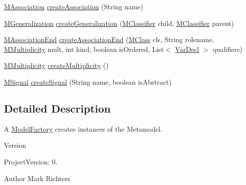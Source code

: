 \begin{DoxyCompactItemize}
\item 
\hyperlink{interfaceorg_1_1tzi_1_1use_1_1uml_1_1mm_1_1_m_association}{M\-Association} \hyperlink{classorg_1_1tzi_1_1use_1_1uml_1_1mm_1_1_model_factory_a3cbbfb827aa6c8ed703ba635f4c519ff}{create\-Association} (String name)
\item 
\hyperlink{classorg_1_1tzi_1_1use_1_1uml_1_1mm_1_1_m_generalization}{M\-Generalization} \hyperlink{classorg_1_1tzi_1_1use_1_1uml_1_1mm_1_1_model_factory_a00cbabfc373b582fb77c0740a5559d62}{create\-Generalization} (\hyperlink{interfaceorg_1_1tzi_1_1use_1_1uml_1_1mm_1_1_m_classifier}{M\-Classifier} child, \hyperlink{interfaceorg_1_1tzi_1_1use_1_1uml_1_1mm_1_1_m_classifier}{M\-Classifier} parent)
\item 
\hyperlink{classorg_1_1tzi_1_1use_1_1uml_1_1mm_1_1_m_association_end}{M\-Association\-End} \hyperlink{classorg_1_1tzi_1_1use_1_1uml_1_1mm_1_1_model_factory_a2cd3859d5f4672d05c05ed2817ebcefd}{create\-Association\-End} (\hyperlink{interfaceorg_1_1tzi_1_1use_1_1uml_1_1mm_1_1_m_class}{M\-Class} cls, String rolename, \hyperlink{classorg_1_1tzi_1_1use_1_1uml_1_1mm_1_1_m_multiplicity}{M\-Multiplicity} mult, int kind, boolean is\-Ordered, List$<$ \hyperlink{classorg_1_1tzi_1_1use_1_1uml_1_1ocl_1_1expr_1_1_var_decl}{Var\-Decl} $>$ qualifiers)
\item 
\hyperlink{classorg_1_1tzi_1_1use_1_1uml_1_1mm_1_1_m_multiplicity}{M\-Multiplicity} \hyperlink{classorg_1_1tzi_1_1use_1_1uml_1_1mm_1_1_model_factory_aa274d522998c38e692a086465214e62c}{create\-Multiplicity} ()
\item 
\hyperlink{interfaceorg_1_1tzi_1_1use_1_1uml_1_1mm_1_1commonbehavior_1_1communications_1_1_m_signal}{M\-Signal} \hyperlink{classorg_1_1tzi_1_1use_1_1uml_1_1mm_1_1_model_factory_aeb17aa15a8489b175c705b9a9d2ccc53}{create\-Signal} (String name, boolean is\-Abstract)
\end{DoxyCompactItemize}


\subsection{Detailed Description}
A \hyperlink{classorg_1_1tzi_1_1use_1_1uml_1_1mm_1_1_model_factory}{Model\-Factory} creates instances of the Metamodel.

\begin{DoxyVersion}{Version}

\end{DoxyVersion}
\begin{DoxyParagraph}{Project\-Version\-:}
0. 
\end{DoxyParagraph}
\begin{DoxyAuthor}{Author}
Mark Richters 
\end{DoxyAuthor}


